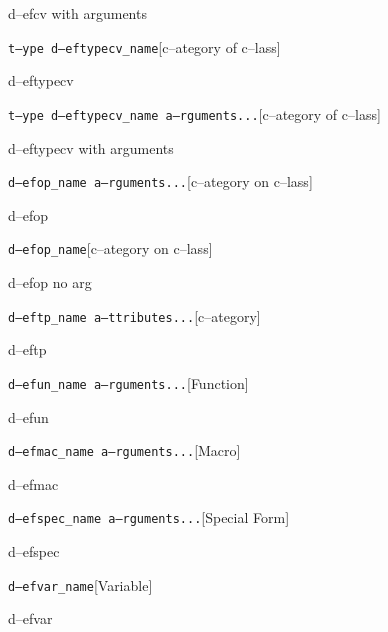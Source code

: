 \documentclass{book}
\begin{document}
%
d--efcv with arguments

\noindent\texttt\bgroup{}t--ype d--eftypecv\_name\egroup{}\hfill[c--ategory of c--lass]



%
d--eftypecv

\noindent\texttt\bgroup{}t--ype d--eftypecv\_name a--rguments...\egroup{}\hfill[c--ategory of c--lass]



%
d--eftypecv with arguments

\noindent\texttt\bgroup{}d--efop\_name a--rguments...\egroup{}\hfill[c--ategory on c--lass]



%
d--efop

\noindent\texttt\bgroup{}d--efop\_name\egroup{}\hfill[c--ategory on c--lass]



%
d--efop no arg

\noindent\texttt\bgroup{}d--eftp\_name a--ttributes...\egroup{}\hfill[c--ategory]



%
d--eftp

\noindent\texttt\bgroup{}d--efun\_name a--rguments...\egroup{}\hfill[Function]



%
d--efun

\noindent\texttt\bgroup{}d--efmac\_name a--rguments...\egroup{}\hfill[Macro]



%
d--efmac

\noindent\texttt\bgroup{}d--efspec\_name a--rguments...\egroup{}\hfill[Special Form]



%
d--efspec

\noindent\texttt\bgroup{}d--efvar\_name\egroup{}\hfill[Variable]



%
d--efvar
\end{document}
